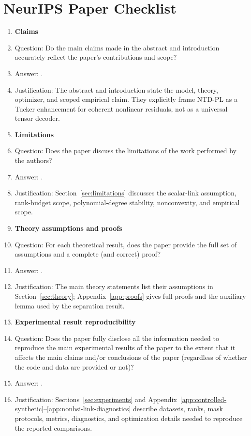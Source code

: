 \section*{NeurIPS Paper Checklist}

\providecommand{\answerPartial}[1][]{\textcolor{orange}{[Partial]#1}}

\begin{enumerate}

\item {\bf Claims}
    \item[] Question: Do the main claims made in the abstract and introduction accurately reflect the paper's contributions and scope?
    \item[] Answer: \answerYes{}.
    \item[] Justification: The abstract and introduction state the model, theory, optimizer, and scoped empirical claim. They explicitly frame NTD-PL as a Tucker enhancement for coherent nonlinear residuals, not as a universal tensor decoder.

\item {\bf Limitations}
    \item[] Question: Does the paper discuss the limitations of the work performed by the authors?
    \item[] Answer: \answerYes{}.
    \item[] Justification: Section~\ref{sec:limitations} discusses the scalar-link assumption, rank-budget scope, polynomial-degree stability, nonconvexity, and empirical scope.

\item {\bf Theory assumptions and proofs}
    \item[] Question: For each theoretical result, does the paper provide the full set of assumptions and a complete (and correct) proof?
    \item[] Answer: \answerYes{}.
    \item[] Justification: The main theory statements list their assumptions in Section~\ref{sec:theory}; Appendix~\ref{app:proofs} gives full proofs and the auxiliary lemma used by the separation result.

\item {\bf Experimental result reproducibility}
    \item[] Question: Does the paper fully disclose all the information needed to reproduce the main experimental results of the paper to the extent that it affects the main claims and/or conclusions of the paper (regardless of whether the code and data are provided or not)?
    \item[] Answer: \answerYes{}.
    \item[] Justification: Sections~\ref{sec:experiments} and Appendix~\ref{app:controlled-synthetic}--\ref{app:nonhsi-link-diagnostics} describe datasets, ranks, mask protocols, metrics, diagnostics, and optimization details needed to reproduce the reported comparisons.


\end{enumerate}
